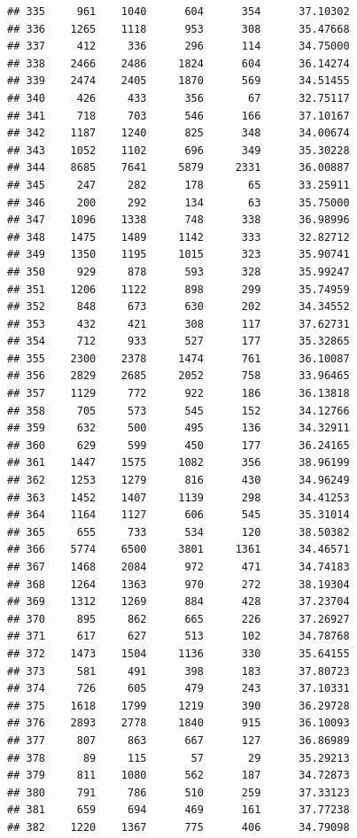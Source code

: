 \documentclass[
]{article}
\begin{document}
\begin{verbatim}
## 335     961    1040      604      354      37.10302
## 336    1265    1118      953      308      35.47668
## 337     412     336      296      114      34.75000
## 338    2466    2486     1824      604      36.14274
## 339    2474    2405     1870      569      34.51455
## 340     426     433      356       67      32.75117
## 341     718     703      546      166      37.10167
## 342    1187    1240      825      348      34.00674
## 343    1052    1102      696      349      35.30228
## 344    8685    7641     5879     2331      36.00887
## 345     247     282      178       65      33.25911
## 346     200     292      134       63      35.75000
## 347    1096    1338      748      338      36.98996
## 348    1475    1489     1142      333      32.82712
## 349    1350    1195     1015      323      35.90741
## 350     929     878      593      328      35.99247
## 351    1206    1122      898      299      35.74959
## 352     848     673      630      202      34.34552
## 353     432     421      308      117      37.62731
## 354     712     933      527      177      35.32865
## 355    2300    2378     1474      761      36.10087
## 356    2829    2685     2052      758      33.96465
## 357    1129     772      922      186      36.13818
## 358     705     573      545      152      34.12766
## 359     632     500      495      136      34.32911
## 360     629     599      450      177      36.24165
## 361    1447    1575     1082      356      38.96199
## 362    1253    1279      816      430      34.96249
## 363    1452    1407     1139      298      34.41253
## 364    1164    1127      606      545      35.31014
## 365     655     733      534      120      38.50382
## 366    5774    6500     3801     1361      34.46571
## 367    1468    2084      972      471      34.74183
## 368    1264    1363      970      272      38.19304
## 369    1312    1269      884      428      37.23704
## 370     895     862      665      226      37.26927
## 371     617     627      513      102      34.78768
## 372    1473    1504     1136      330      35.64155
## 373     581     491      398      183      37.80723
## 374     726     605      479      243      37.10331
## 375    1618    1799     1219      390      36.29728
## 376    2893    2778     1840      915      36.10093
## 377     807     863      667      127      36.86989
## 378      89     115       57       29      35.29213
## 379     811    1080      562      187      34.72873
## 380     791     786      510      259      37.33123
## 381     659     694      469      161      37.77238
## 382    1220    1367      775      406      34.79098

\end{verbatim}
\end{document}
